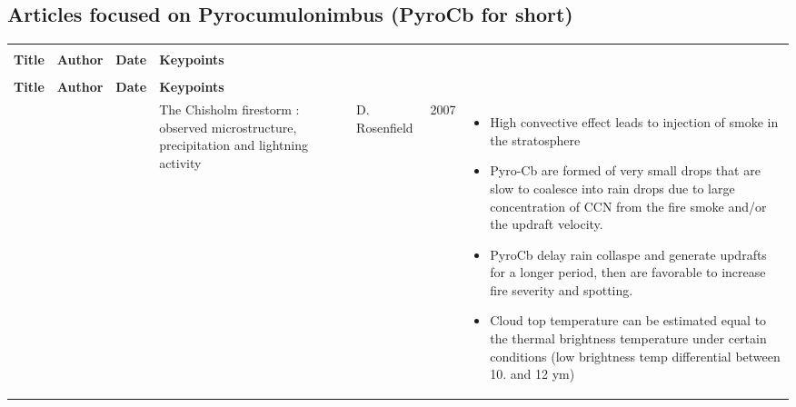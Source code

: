 \documentclass[12pt]{article}
\begin{document}
\newpage 

\subsection{Articles focused on Pyrocumulonimbus (PyroCb for short)}
\begin{center}
\begin{longtable}{|p{4.5cm}|p{2cm}|p{0.8cm}|p{7.5cm}|}

\hline
 & & & \tabularnewline
\textbf{Title} & \textbf{Author} & \textbf{Date} & \textbf{Keypoints} \tabularnewline
 & & & \endfirsthead
 \hline
 
 \hline
 & & & \tabularnewline
\textbf{Title} & \textbf{Author} & \textbf{Date} & \textbf{Keypoints} \tabularnewline
 & & & \endhead
 \hline
 
 \hline
\endlastfoot
 \hline
 
 \hline
\endfoot
 \hline
 


\raggedright The Chisholm firestorm : observed microstructure, precipitation and lightning activity & D. Rosenfield & 2007 & \raggedleft 
\begin{itemize} 
\item High convective effect leads to injection of smoke in the stratosphere
\item Pyro-Cb are formed of very small drops that are slow to coalesce into rain drops due to large concentration of CCN from the fire smoke and/or the updraft velocity.
\item PyroCb delay rain collaspe and generate updrafts for a longer period, then are favorable to increase fire severity and spotting.
\item Cloud top temperature can be estimated equal to the thermal brightness temperature under certain conditions (low brightness temp differential between 10. and 12 ym)
\end{itemize} 
\tabularnewline

\hline


\end{longtable}
\end{center}
\end{document}
